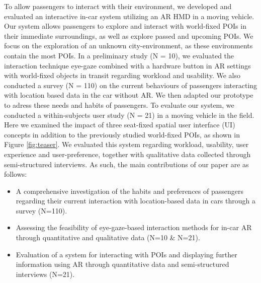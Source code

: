To allow passengers to interact with their environment, we developed and evaluated an interactive in-car system utilizing an AR HMD in a moving vehicle. Our system allows passengers to explore and interact with world-fixed POIs in their immediate surroundings, as well as explore passed and upcoming POIs. We focus on the exploration of an unknown city-environment, as these environments contain the most POIs. In a preliminary study (N = 10), we evaluated the interaction technique eye-gaze combined with a hardware button in AR settings with world-fixed objects in transit regarding workload and usability. We also conducted a survey (N = 110) on the current behaviours of passengers interacting with location based data in the car without AR. We then adapted our prototype to adress these needs and habits of passengers. To evaluate our system, we conducted a within-subjects user study (N = 21) in a moving vehicle in the field. Here we examined the impact of three seat-fixed spatial user interface (UI) concepts in addition to the previously studied world-fixed POIs, as shown in Figure \ref{fig:teaser}. We evaluated this system regarding workload, usability, user experience and user-preference, together with qualitative data collected through semi-structured interviews. As such, the main contributions of our paper are as follows: 
\begin{itemize}
    \item A comprehensive investigation of the habits and preferences of passengers regarding their current interaction with location-based data in cars through a survey (N=110).
    \item Assessing the feasibility of eye-gaze-based interaction methods for in-car AR through quantitative and qualitative data (N=10 \& N=21).
    \item Evaluation of a system for interacting with POIs and displaying further information using AR through quantitative data and semi-structured interviews (N=21).
\end{itemize}